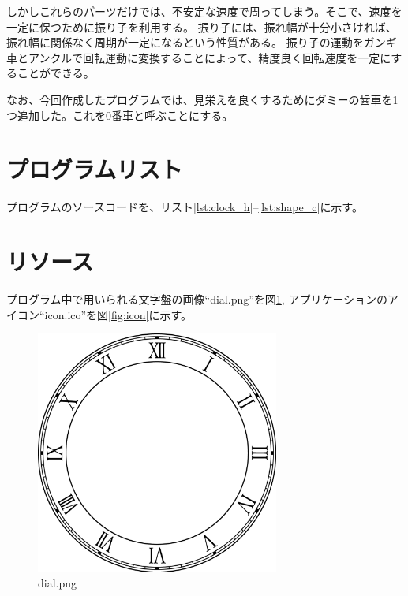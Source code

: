 \documentclass[a4j,titlepage]{jsarticle}
\begin{document}
しかしこれらのパーツだけでは、不安定な速度で周ってしまう。そこで、速度を一定に保つために振り子を利用する。
振り子には、振れ幅が十分小さければ、振れ幅に関係なく周期が一定になるという性質がある。
振り子の運動をガンギ車とアンクルで回転運動に変換することによって、精度良く回転速度を一定にすることができる。

なお、今回作成したプログラムでは、見栄えを良くするためにダミーの歯車を1つ追加した。これを0番車と呼ぶことにする。


\section{プログラムリスト}
プログラムのソースコードを、リスト\ref{lst:clock_h}--\ref{lst:shape_c}に示す。












\section{リソース}
プログラム中で用いられる文字盤の画像``dial.png''を図\ref{fig:dial}, アプリケーションのアイコン``icon.ico''を図\ref{fig:icon}に示す。

\begin{figure}[H]
  \centering
  \includegraphics[width=8cm]{clock/dial.png}
  \caption{dial.png}
  \label{fig:dial}
\end{figure}
\end{document}
